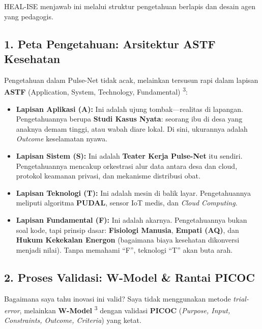 \documentclass[
  letterpaper,
  DIV=11,
  numbers=noendperiod]{scrreprt}
\providecommand{\tightlist}{%
  \setlength{\itemsep}{0pt}\setlength{\parskip}{0pt}}
\begin{document}
HEAL-ISE menjawab ini melalui struktur pengetahuan berlapis dan desain
agen yang pedagogis.

\subsection{1. Peta Pengetahuan: Arsitektur ASTF
Kesehatan}\label{peta-pengetahuan-arsitektur-astf-kesehatan}

Pengetahuan dalam Pulse-Net tidak acak, melainkan tersusun rapi dalam
lapisan \textbf{ASTF} (Application, System, Technology, Fundamental)
\textsuperscript{3}:

\begin{itemize}
\tightlist
\item
  \textbf{Lapisan Aplikasi (A):} Ini adalah ujung tombak---realitas di
  lapangan. Pengetahuannya berupa \textbf{Studi Kasus Nyata}: seorang
  ibu di desa yang anaknya demam tinggi, atau wabah diare lokal. Di
  sini, ukurannya adalah \emph{Outcome} keselamatan nyawa.
\item
  \textbf{Lapisan Sistem (S):} Ini adalah \textbf{Teater Kerja
  Pulse-Net} itu sendiri. Pengetahuannya mencakup orkestrasi alur data
  antara desa dan cloud, protokol keamanan privasi, dan mekanisme
  distribusi obat.
\item
  \textbf{Lapisan Teknologi (T):} Ini adalah mesin di balik layar.
  Pengetahuannya meliputi algoritma \textbf{PUDAL}, sensor IoT medis,
  dan \emph{Cloud Computing}.
\item
  \textbf{Lapisan Fundamental (F):} Ini adalah akarnya. Pengetahuannya
  bukan soal kode, tapi prinsip dasar: \textbf{Fisiologi Manusia},
  \textbf{Empati (AQ)}, dan \textbf{Hukum Kekekalan Energon} (bagaimana
  biaya kesehatan dikonversi menjadi nilai). Tanpa memahami ``F'',
  teknologi ``T'' akan buta arah.
\end{itemize}

\subsection{2. Proses Validasi: W-Model \& Rantai
PICOC}\label{proses-validasi-w-model-rantai-picoc}

Bagaimana saya tahu inovasi ini valid? Saya tidak menggunakan metode
\emph{trial-error}, melainkan \textbf{W-Model} \textsuperscript{3}
dengan validasi \textbf{PICOC} (\emph{Purpose, Input, Constraints,
Outcome, Criteria}) yang ketat.
\end{document}

